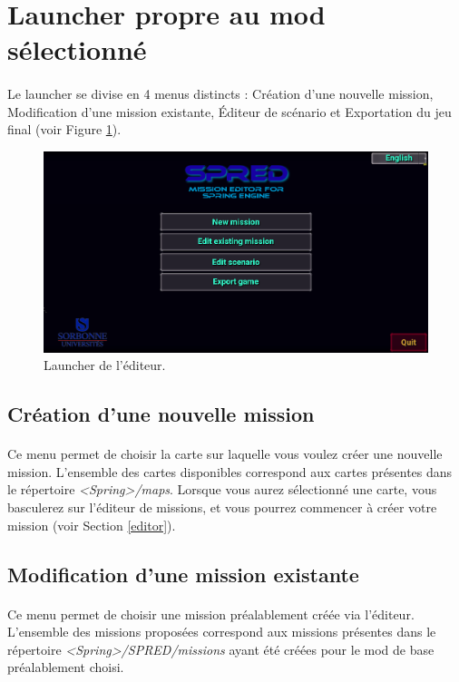 \documentclass[a4paper]{article}
\begin{document}
\section{Launcher propre au mod sélectionné}\label{launcher}
\paragraph{ }
Le launcher se divise en 4 menus distincts : Création d'une nouvelle mission, Modification d'une mission existante, Éditeur de scénario et Exportation du jeu final (voir Figure \ref{fig:launcher-main}).
\begin{figure}[H]
\centering
\includegraphics[width=\linewidth]{launcher-main.png}
\caption{Launcher de l'éditeur.}
\label{fig:launcher-main}
\end{figure}
\subsection{Création d'une nouvelle mission}
\paragraph{ }
Ce menu permet de choisir la carte sur laquelle vous voulez créer une nouvelle mission. L'ensemble des cartes disponibles correspond aux cartes présentes dans le répertoire \textit{<Spring>/maps}. Lorsque vous aurez sélectionné une carte, vous basculerez sur l'éditeur de missions, et vous pourrez commencer à créer votre mission (voir Section \ref{editor}).
\subsection{Modification d'une mission existante}
\paragraph{ }
Ce menu permet de choisir une mission préalablement créée via l'éditeur. L'ensemble des missions proposées correspond aux missions présentes dans le répertoire \textit{<Spring>/SPRED/missions} ayant été créées pour le mod de base préalablement choisi.
\end{document}

